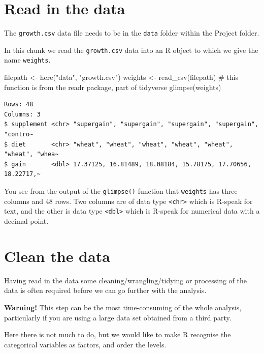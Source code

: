 \documentclass[
  letterpaper,
  DIV=11,
  numbers=noendperiod]{scrreprt}
\newenvironment{Shaded}{\begin{snugshade}}{\end{snugshade}}
\newcommand{\CommentTok}[1]{\textcolor[rgb]{0.37,0.37,0.37}{#1}}
\newcommand{\FunctionTok}[1]{\textcolor[rgb]{0.28,0.35,0.67}{#1}}
\newcommand{\NormalTok}[1]{\textcolor[rgb]{0.00,0.23,0.31}{#1}}
\newcommand{\OtherTok}[1]{\textcolor[rgb]{0.00,0.23,0.31}{#1}}
\newcommand{\StringTok}[1]{\textcolor[rgb]{0.13,0.47,0.30}{#1}}
\begin{document}
\section{Read in the data}\label{read-in-the-data}

The \texttt{growth.csv} data file needs to be in the \texttt{data}
folder within the Project folder.

In this chunk we read the \texttt{growth.csv} data into an R object to
which we give the name \texttt{weights}.

\begin{Shaded}
\begin{Highlighting}[]
\NormalTok{filepath }\OtherTok{\textless{}{-}} \FunctionTok{here}\NormalTok{(}\StringTok{"data"}\NormalTok{, }\StringTok{"growth.csv"}\NormalTok{)}
\NormalTok{weights }\OtherTok{\textless{}{-}} \FunctionTok{read\_csv}\NormalTok{(filepath) }\CommentTok{\# this function is from the readr package, part of tidyverse}
\FunctionTok{glimpse}\NormalTok{(weights)}
\end{Highlighting}
\end{Shaded}

\begin{verbatim}
Rows: 48
Columns: 3
$ supplement <chr> "supergain", "supergain", "supergain", "supergain", "contro~
$ diet       <chr> "wheat", "wheat", "wheat", "wheat", "wheat", "wheat", "whea~
$ gain       <dbl> 17.37125, 16.81489, 18.08184, 15.78175, 17.70656, 18.22717,~
\end{verbatim}

You see from the output of the \texttt{glimpse()} function that
\texttt{weights} has three columns and 48 rows. Two columns are of data
type \texttt{\textless{}chr\textgreater{}} which is R-speak for text,
and the other is data type \texttt{\textless{}dbl\textgreater{}} which
is R-speak for numerical data with a decimal point.

\section{Clean the data}\label{clean-the-data}

Having read in the data some cleaning/wrangling/tidying or processing of
the data is often required before we can go further with the analysis.

\textbf{Warning!} This step can be the most time-consuming of the whole
analysis, particularly if you are using a large data set obtained from a
third party.

Here there is not much to do, but we would like to make R recognise the
categorical variables as factors, and order the levels.
\end{document}

